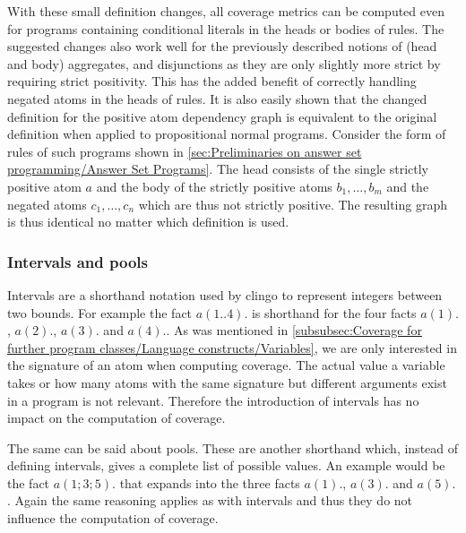 With these small definition changes, all coverage metrics can be computed even for programs containing conditional literals in the heads or bodies of rules. The suggested changes also work well for the previously described notions of (head and body) aggregates, and disjunctions as they are only slightly more strict by requiring strict positivity. This has the added benefit of correctly handling negated atoms in the heads of rules. It is also easily shown that the changed definition for the positive atom dependency graph is equivalent to the original definition when applied to propositional normal programs. Consider the form of rules of such programs shown in \cref{sec:Preliminaries on answer set programming/Answer Set Programs}. The head consists of the single strictly positive atom $a$ and the body of the strictly positive atoms \(b_1, \ldots, b_m\) and the negated atoms \(c_1, \ldots, c_n\) which are thus not strictly positive. The resulting graph is thus identical no matter which definition is used.


\subsubsection{Intervals and pools}
\label{subsubsec:Coverage for further program classes/Language constructs/Intervals and pools}
Intervals are a shorthand notation used by clingo to represent integers between two bounds. For example the fact \(a(1..4).\) is shorthand for the four facts \(a(1).\), \(a(2).\), \(a(3).\) and \(a(4).\). As was mentioned in \cref{subsubsec:Coverage for further program classes/Language constructs/Variables}, we are only interested in the signature of an atom when computing coverage. The actual value a variable takes or how many atoms with the same signature but different arguments exist in a program is not relevant. Therefore the introduction of intervals has no impact on the computation of coverage.

The same can be said about pools. These are another shorthand which, instead of defining intervals, gives a complete list of possible values. An example would be the fact \(a(1;3;5).\) that expands into the three facts \(a(1).\), \(a(3).\) and \(a(5).\). Again the same reasoning applies as with intervals and thus they do not influence the computation of coverage.

